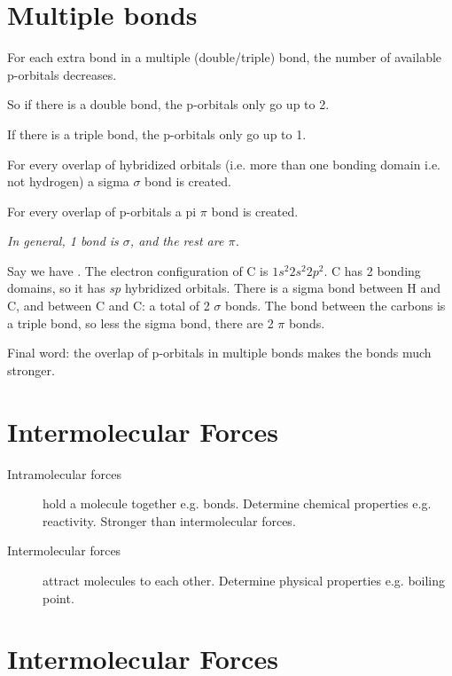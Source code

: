 \documentclass[a4paper, 8pt]{memoir}
\begin{document}
\section{Multiple bonds}
For each extra bond in a multiple (double/triple) bond, the number of available p-orbitals decreases.

So if there is a double bond, the p-orbitals only go up to 2.

If there is a triple bond, the p-orbitals only go up to 1.

For every overlap of hybridized orbitals (i.e. more than one bonding domain i.e. not hydrogen) a sigma $\sigma$ bond is created. 

For every overlap of p-orbitals a pi $\pi$ bond is created. 

\emph{In general, 1 bond is $\sigma$, and the rest are $\pi$.}

Say we have . The electron configuration of C is $1s^2 2s^2 2p^2$. C has 2 bonding domains, so it has \emph{sp} hybridized orbitals. There is a sigma bond between H and C, and between C and C: a total of 2 $\sigma$ bonds. The bond between the carbons is a triple bond, so less the sigma bond, there are 2 $\pi$ bonds.

Final word: the overlap of p-orbitals in multiple bonds makes the bonds much stronger.

\section{Intermolecular Forces}
\begin{description}
\item[Intramolecular forces] hold a molecule together e.g. bonds. Determine chemical properties e.g. reactivity. Stronger than intermolecular forces.
\item[Intermolecular forces] attract molecules to each other. Determine physical properties e.g. boiling point.
\end{description}
\section{Intermolecular Forces}
\end{document}
